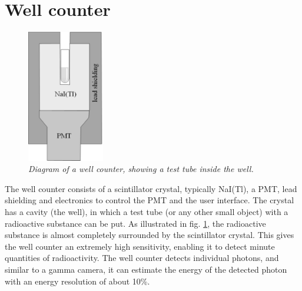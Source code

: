 \documentclass[11pt,oneside]{book}
\begin{document}
\section{Well counter}
\begin{figure}[tb]
\centering
\includegraphics[width=0.3\textwidth]{figs/fig_wellcounter.pdf}
\caption{\label{fig:wellcounter} \emph{Diagram of a well counter, showing a
    test tube inside the well.}}
\end{figure}
The well counter consists of a scintillator crystal, typically
NaI(Tl), a PMT, lead shielding and electronics to control the PMT and
the user interface. The crystal has a cavity (the well), in which a
test tube (or any other small object) with a radioactive substance can
be put. As illustrated in fig. \ref{fig:wellcounter}, the radioactive
substance is almost completely surrounded by the scintillator
crystal. This gives the well counter an extremely high sensitivity,
enabling it to detect minute quantities of radioactivity. The well
counter detects individual photons, and similar to a gamma camera, it
can estimate the energy of the detected photon with an energy
resolution of about 10\%.
\end{document}
